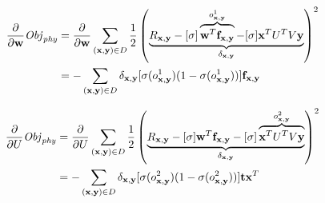 \begin{align*}
\frac{\partial}{\partial \w} \Obj_\phy & = \frac{\partial}{\partial \w} \sum_{(\x,\y) \in D} \frac{1}{2} \left( \underbrace{R_{\x,\y} - [\sigma] \overbrace{\w^T \f_{\x,\y}}^{o^1_{\x,\y}} - [\sigma] \x^T U^T V\y}_{\delta_{\x,\y}} \right)^2 \\
& = - \sum_{(\x,\y) \in D} \delta_{\x,\y} [\sigma(o^1_{\x,\y}) (1 - \sigma(o^1_{\x,\y}))] \f_{\x,\y} 
\end{align*}

\begin{align*}
\frac{\partial}{\partial U} \Obj_\phy & = \frac{\partial}{\partial U} \sum_{(\x,\y) \in D} \frac{1}{2} \left( \underbrace{R_{\x,\y} - [\sigma] \w^T \f_{\x,\y} - [\sigma] \overbrace{\x^T U^T V\y}^{o^2_{\x,\y}}}_{\delta_{\x,\y}}\right)^2 \\
& = - \sum_{(\x,\y) \in D} \delta_{\x,\y} [\sigma(o^2_{\x,\y}) (1 - \sigma(o^2_{\x,\y}))] \t \x^T
\end{align*}

